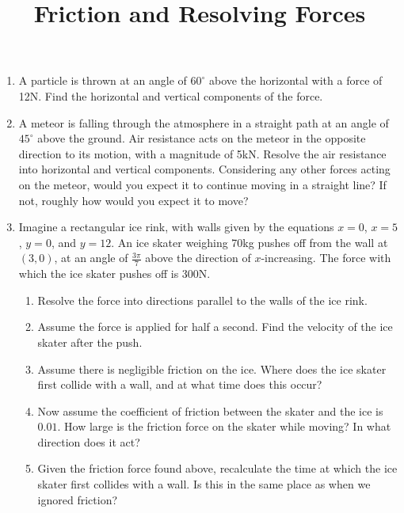 \documentclass{article}
\begin{document}
\title{Friction and Resolving Forces}
\date{}

\maketitle
\thispagestyle{empty}

\Large



\begin{enumerate}
	\item A particle is thrown at an angle of $60^\circ$ above the horizontal with a force of 12N. Find the horizontal and vertical components of the force.
	\item A meteor is falling through the atmosphere in a straight path at an angle of $45^\circ$ above the ground. Air resistance acts on the meteor in the opposite direction to its motion, with a magnitude of 5kN. Resolve the air resistance into horizontal and vertical components. Considering any other forces acting on the meteor, would you expect it to continue moving in a straight line? If not, roughly how would you expect it to move?
	\item Imagine a rectangular ice rink, with walls given by the equations $x=0$, $x=5$, $y=0$, and $y=12$. An ice skater weighing 70kg pushes off from the wall at $(3,0)$, at an angle of $\frac{3\pi}{7}$ above the direction of $x$-increasing. The force with which the ice skater pushes off is 300N.
		\begin{enumerate}
			\item Resolve the force into directions parallel to the walls of the ice rink.
			\item Assume the force is applied for half a second. Find the velocity of the ice skater after the push.
			\item Assume there is negligible friction on the ice. Where does the ice skater first collide with a wall, and at what time does this occur?
			\item Now assume the coefficient of friction between the skater and the ice is $0.01$. How large is the friction force on the skater while moving? In what direction does it act?
			\item Given the friction force found above, recalculate the time at which the ice skater first collides with a wall. Is this in the same place as when we ignored friction?
		\end{enumerate}
\end{enumerate}
\end{document}
